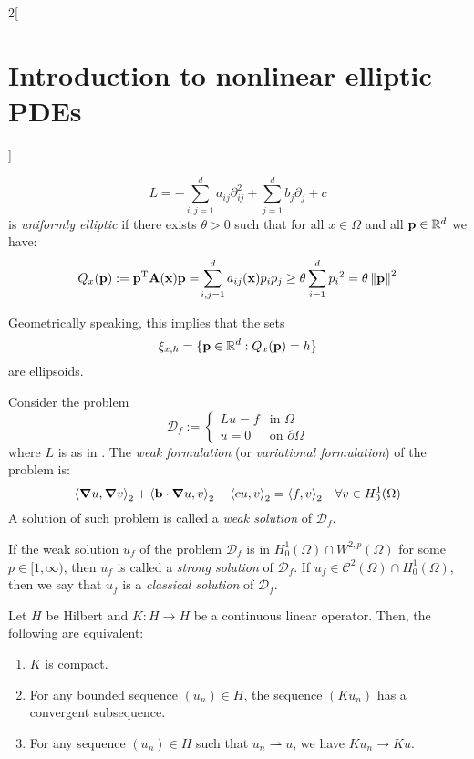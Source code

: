 \documentclass[../../../main_math.tex]{subfiles}
\begin{document}
\begin{multicols}{2}[\section{Introduction to nonlinear elliptic PDEs}]
\begin{definition}
    \begin{equation}\label{INEPDE:operator}
      L=-\sum_{i,j=1}^da_{ij}\partial_{ij}^2 + \sum_{j=1}^d b_j\partial_j+c
    \end{equation}
    is \emph{uniformly elliptic} if there exists $\theta>0$ such that for all $x\in \Omega$ and all $\boldsymbol{\mathrm{p}}\in \mathbb{R}^d$ we have:
    \begin{equation*}
      Q_x(\boldsymbol{\mathrm{p}}):={\boldsymbol{\mathrm{p}}}^{\mathrm{T}}\boldsymbol{\mathrm{A}}(\boldsymbol{\mathrm{x}})\boldsymbol{\mathrm{p}}=\!\sum_{i,j=1}^da_{ij}(\boldsymbol{\mathrm{x}})p_ip_j\geq \theta \sum_{i=1}^{d} {p_i}^2=\theta \left\|\boldsymbol{\mathrm{p}}\right\|^2
    \end{equation*}
  \end{definition}
  \begin{remark}
    Geometrically speaking, this implies that the sets
    $$
      \xi_{x,h}=\{ \boldsymbol{\mathrm{p}}\in \mathbb{R}^d: Q_x(\boldsymbol{\mathrm{p}})=h\}
    $$
    are ellipsoids.
  \end{remark}
  \begin{definition}
    Consider the problem
    $$
      \mathcal{D}_f:=\begin{cases}
        Lu=f & \text{in }\Omega         \\
        u=0  & \text{on }\partial\Omega
      \end{cases}
    $$
    where $L$ is as in . The \emph{weak formulation} (or \emph{variational formulation}) of the problem is:
    \begin{equation*}
      {\langle \grad u,\grad v\rangle}_2+{\langle \boldsymbol{\mathrm{b}}\cdot \grad u,v\rangle}_2 + {\langle cu,v\rangle}_2={\langle f,v\rangle}_2\quad \forall v\in H_0^1(\Omega)
    \end{equation*}
    A solution of such problem is called a \emph{weak solution} of $\mathcal{D}_f$.
  \end{definition}
  \begin{definition}
    If the weak solution $u_f$ of the problem $\mathcal{D}_f$ is in $H^1_0(\Omega)\cap W^{2,p}(\Omega)$ for some $p\in [1,\infty)$, then $u_f$ is called a \emph{strong solution} of $\mathcal{D}_f$. If $u_f\in \mathcal{C}^2(\Omega)\cap H^1_0(\Omega)$, then we say that $u_f$ is a \emph{classical solution} of $\mathcal{D}_f$.
  \end{definition}
  \begin{proposition}
    Let $H$ be Hilbert and $K:H\to H$ be a continuous linear operator. Then, the following are equivalent:
    \begin{enumerate}
      \item $K$ is compact.
      \item For any bounded sequence $(u_n)\in H$, the sequence $(Ku_n)$ has a convergent subsequence.
      \item For any sequence $(u_n)\in H$ such that $u_n\rightharpoonup u$, we have $Ku_n\to Ku$.
    \end{enumerate}
  \end{proposition}

\end{multicols}
\end{document}
